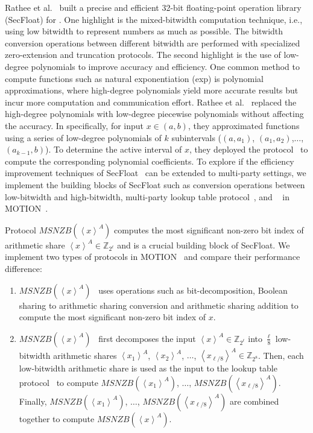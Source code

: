 Rathee et al.~\cite{rathee2022secfloat} built a precise and efficient 32-bit floating-point operation library (SecFloat) for \twopc. One highlight is the mixed-bitwidth computation technique, i.e., using low bitwidth to represent numbers as much as possible. The bitwidth conversion operations between different bitwidth are performed with specialized zero-extension and truncation \twopc protocols.
The second highlight is the use of low-degree polynomials to improve accuracy and efficiency.
One common method to compute functions such as natural exponentiation (exp) is polynomial approximations, where high-degree polynomials yield more accurate results but incur more computation and communication effort. Rathee et al.~\cite{rathee2022secfloat} replaced the high-degree polynomials with low-degree piecewise polynomials without affecting the accuracy. In specifically, for input $x\in \left(a,b\right) $, they approximated functions using a series of low-degree polynomials of $k$ subintervals ($\left(a, a_1\right) $, $\left(a_1, a_2\right)  $,$\ldots$, $\left(a_{k-1}, b\right) $). To determine the active interval of $x$, they deployed the \lut protocol~\cite{dessouky2017pushing} to compute the corresponding polynomial coefficients.
To explore if the efficiency improvement techniques of SecFloat~\cite{rathee2022secfloat} can be extended to multi-party settings, we implement the building blocks of SecFloat such as conversion operations between low-bitwidth and high-bitwidth, multi-party lookup table protocol~\cite{keller2017faster}, and \msnzb~\cite{rathee2021sirnn} in MOTION~\cite{braun2022motion}.

Protocol $MSNZB\left(\left\langle x\right\rangle^A\right) $ computes the most significant non-zero bit index of arithmetic share $\left\langle x\right\rangle^A \in \mathbb{Z} _{2^{\ell}}$ and is a crucial building block of SecFloat.
We implement two types of \msnzb protocols in MOTION~\cite{braun2022motion} and compare their performance difference:
\begin{enumerate}
    \item $MSNZB\left(\left\langle x\right\rangle^A\right) $~\cite{aliasgari2012secure} uses operations such as bit-decomposition, Boolean sharing to arithmetic sharing conversion and arithmetic sharing addition to compute the most significant non-zero bit index of $x$.
    \item $MSNZB\left(\left\langle x\right\rangle^A\right) $~\cite{rathee2021sirnn} first decomposes the input $\left\langle x\right\rangle^A \in \mathbb{Z} _{2^{\ell}}$ into $\frac{\ell}{8}$ low-bitwidth arithmetic shares $\left\langle x_1\right\rangle^A$, $\left\langle x_2\right\rangle^A$, $\ldots$,  $\left\langle x_{\ell/8}\right\rangle^A\in \mathbb{Z} _{2^{{8}}} $. Then, each low-bitwidth arithmetic share is used as the input to the lookup table protocol~\cite{keller2017faster} to compute $MSNZB\left(\left\langle x_1\right\rangle^A\right) $, $\ldots$, $MSNZB\left(\left\langle x_{\ell/8}\right\rangle^A\right) $. Finally, $MSNZB\left(\left\langle x_1\right\rangle^A\right) $, $\ldots$, $MSNZB\left(\left\langle x_{\ell/8}\right\rangle^A\right) $ are combined together to compute $MSNZB\left(\left\langle x\right\rangle^A\right) $.
\end{enumerate}

